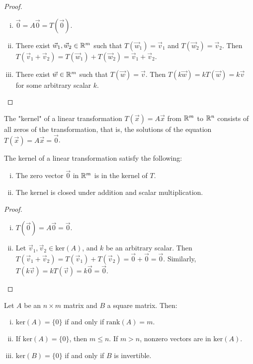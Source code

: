 \documentclass[a4paper,8pt]{article}
\begin{document}
\begin{outline}
    \begin{proof}
      \begin{enumerate}[i.]
        \item
          \(\vec{0} = A\vec{0} = T(\vec{0})\).
        \item
          There exist \(\vec{w}_1, \vec{w}_2 \in \mathbb{R}^m\) such that \(T(\vec{w}_1) = \vec{v}_1\) and
          \(T(\vec{w}_2) = \vec{v}_2\). Then \(T(\vec{v}_1 + \vec{v}_2) = T(\vec{w}_1) + T(\vec{w}_2) =
          \vec{v}_1 + \vec{v}_2\).
        \item
          There exist \(\vec{w} \in \mathbb{R}^m\) such that \(T(\vec{w}) = \vec{v}\). Then \(T(k\vec{w}) =
          kT(\vec{w}) = k\vec{v}\) for some arbitrary scalar \(k\).
      \end{enumerate}
    \end{proof}

    The "kernel" of a linear transformation \(T(\vec{x}) = A\vec{x}\) from \(\mathbb{R}^m\) to \(\mathbb{R}^n\)
    consists of all zeros of the transformation, that is, the solutions of the equation \(T(\vec{x}) = A\vec{x}
    = \vec{0}\).

    The kernel of a linear transformation satisfy the following:
    \begin{enumerate}[i.]
      \item
        The zero vector \(\vec{0}\) in \(\mathbb{R}^m\) is in the kernel of \(T\).
      \item
        The kernel is closed under addition and scalar multiplication.
    \end{enumerate}

    \begin{proof}
      \begin{enumerate}[i.]
        \item
          \(T(\vec{0}) = A\vec{0} = \vec{0}\).
        \item
          Let \(\vec{v}_1, \vec{v}_2 \in \text{ker}(A)\), and \(k\) be an arbitrary scalar. Then \(T(\vec{v}_1
          + \vec{v}_2) = T(\vec{v}_1) + T(\vec{v}_2) = \vec{0} + \vec{0} = \vec{0}\). Similarly, \(T(k\vec{v})
          = kT(\vec{v}) = k\vec{0} = \vec{0}\).
      \end{enumerate}
    \end{proof}

    Let \(A\) be an \(n \times m\) matrix and \(B\) a square matrix. Then:
    \begin{enumerate}[i.]
      \item \(\text{ker}(A) = \{0\}\) if and only if \(\text{rank}(A) = m\).
      \item If \(\text{ker}(A) = \{0\}\), then \(m \leq n\). If \(m > n\), nonzero vectors are in \(\text{ker}(A)\).
      \item \(\text{ker}(B) = \{0\}\) if and only if \(B\) is invertible.
    \end{enumerate}



\end{outline}
\end{document}
